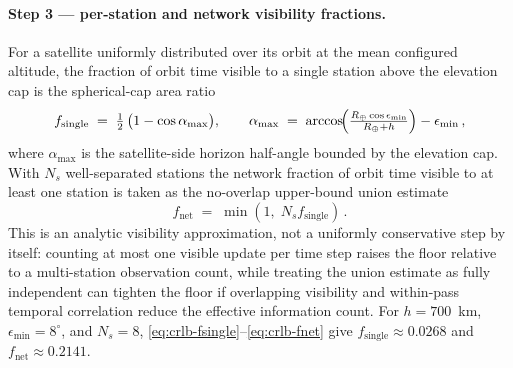 \documentclass{article}
\begin{document}
\paragraph{Step 3 --- per-station and network visibility fractions.}
For a satellite uniformly distributed over its orbit at the mean configured altitude, the fraction of orbit time visible to a single station above the elevation cap is the spherical-cap area ratio
\begin{equation}
f_{\mathrm{single}} \;=\; \tfrac12\,\bigl(1 - \cos\alpha_{\max}\bigr),\qquad \alpha_{\max} \;=\; \arccos\!\Bigl(\tfrac{R_\oplus\cos\epsilon_{\min}}{R_\oplus + h}\Bigr) - \epsilon_{\min}\,,
\label{eq:crlb-fsingle}
\end{equation}
where $\alpha_{\max}$ is the satellite-side horizon half-angle bounded by the elevation cap. With $N_s$ well-separated stations the network fraction of orbit time visible to at least one station is taken as the no-overlap upper-bound union estimate
\begin{equation}
f_{\mathrm{net}} \;=\; \min(1,\;N_s f_{\mathrm{single}})\,.
\label{eq:crlb-fnet}
\end{equation}
This is an analytic visibility approximation, not a uniformly conservative step by itself: counting at most one visible update per time step raises the floor relative to a multi-station observation count, while treating the union estimate as fully independent can tighten the floor if overlapping visibility and within-pass temporal correlation reduce the effective information count. For $h=700$~km, $\epsilon_{\min}=8^{\circ}$, and $N_s=8$, \eqref{eq:crlb-fsingle}--\eqref{eq:crlb-fnet} give $f_{\mathrm{single}}\approx 0.0268$ and $f_{\mathrm{net}}\approx 0.2141$.
\end{document}
